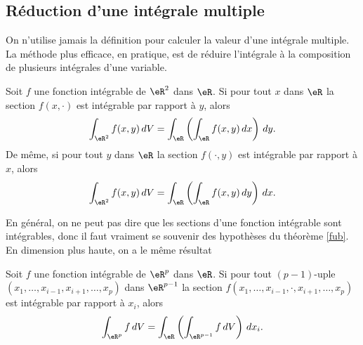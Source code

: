 \subsection{Réduction d'une intégrale multiple}
On n'utilise jamais la définition pour calculer la valeur d'une intégrale multiple. La méthode plus efficace, en pratique, est de réduire l'intégrale à la composition de plusieurs intégrales d'une variable.  
\begin{theorem}[de Fubini]\label{fub}
 Soit $f$ une fonction intégrable de $\eR^2$ dans $\eR$. Si pour tout $x$ dans $\eR$ la section $f(x,\cdot)$ est intégrable par rapport à $y$, alors
\[
\int_{\eR^2}f(x,y)\,dV=\int_{\eR}\left(\int_{\eR}f(x,y)\,dx\right)\,dy.
\]
De même, si pour tout $y$ dans $\eR$ la section $f(\cdot, y)$ est intégrable par rapport à $x$, alors
\[
\int_{\eR^2}f(x,y)\,dV=\int_{\eR}\left(\int_{\eR}f(x,y)\,dy\right)\,dx.
\] 
\end{theorem}		\label{ThoSectionINte}
En général, on ne peut pas dire que les sections d'une fonction intégrable sont intégrables, donc il faut vraiment se souvenir des hypothèses du théorème \ref{fub}. En dimension plus haute, on a le même résultat
\begin{theorem}
 Soit $f$ une fonction intégrable de $\eR^p$ dans $\eR$. Si pour tout $(p-1)$-uple $(x_1,\ldots, x_{i-1},x_{i+1}, \ldots, x_p)$ dans $\eR^{p-1}$ la section $f(x_1,\ldots, x_{i-1},\cdot,x_{i+1}, \ldots, x_p)$ est intégrable par rapport à $x_i$, alors
\[
\int_{\eR^p}f \,dV=\int_{\eR}\left(\int_{\eR^{p-1}}f \,dV\right)\,dx_i.
\]
\end{theorem}

